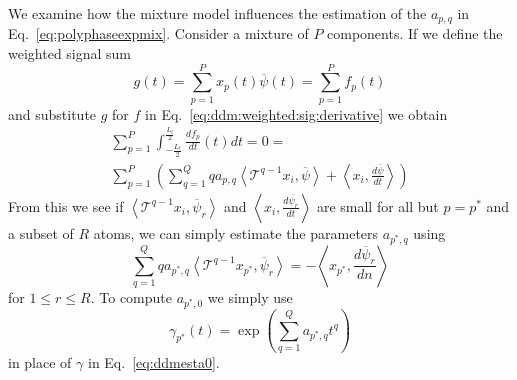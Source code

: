 \documentclass[twoside,a4paper]{article}
\begin{document}
We examine how the mixture model influences the estimation of the $a_{p,q}$ in
Eq.~\ref{eq:polyphaseexpmix}.
Consider a mixture of $P$ components.
If we define the weighted signal sum
%
\begin{equation}
    g(t) = \sum_{p=1}^{P} x_{p}(t) \overline{\psi}(t) = \sum_{p=1}^{P} f_{p}(t)
\end{equation}
%
and substitute $g$ for $f$ in Eq.~\ref{eq:ddm:weighted:sig:derivative} we obtain
%
\begin{multline}
    \label{eq:mixest}
    \sum_{p=1}^{P} \int_{-\frac{L_{t}}{2}}^{\frac{L_{t}}{2}}
    \frac{df_{p}}{dt}(t)dt =
    0
    = \\ 
    \sum_{p=1}^{P} \left(
    \sum_{q=1}^{Q} q a_{p,q} 
    \left\langle \mathcal{T}^{q-1} x_i , \overline{\psi} \right\rangle
    + \left\langle x_i, \frac{d\overline{\psi}}{dt} \right\rangle \right)
\end{multline}
%
From this we see if $\left\langle \mathcal{T}^{q-1} x_i , \overline{\psi}_{r}
\right\rangle$ and $\left\langle x_i, \frac{d\overline{\psi_{r}}}{dt} \right\rangle$
are small for all but $p = p^{\ast}$ and a subset of $R$ atoms, we
can simply estimate the parameters $a_{p^{\ast},q}$ using
\begin{equation}
    \sum_{q=1}^{Q} q a_{{p^{\ast}},q} 
    \left\langle \mathcal{T}^{q-1} x_{p^{\ast}} , \overline{\psi}_{r} \right\rangle
    = -\left\langle x_{p^{\ast}}, \frac{d\overline{\psi}_{r}}{dn} \right\rangle
\end{equation}
for $1 \leq r \leq R$. To compute $a_{p^{\ast},0}$ we simply use
\begin{equation}
    \gamma_{p^{\ast}}(t) = \exp \left( \sum_{q=1}^{Q} a_{p^{\ast},q} t^{q} \right)
\end{equation}
in place of $\gamma$ in Eq.~\ref{eq:ddmesta0}.
\end{document}
